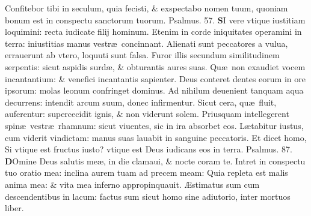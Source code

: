 \documentclass[a5paper,10pt]{book}
\def\ae{æ}
\def\AE{Æ}
\begin{document}
\begin{multicols*}{2}
\newline \color{red} C\color{black}onfitebor tibi in seculum, quia fecisti, \& exspectabo nomen tuum, quoniam bonum est in conspectu sanctorum tuorum. \quad \color{red} Psalmus. \hypertarget{ps57}{57.} \color{black}
\vspace{-.25em}
\lettrine[lines=2]{\bfseries \color{red} S}{}I vere vtique iustitiam loquimini: recta iudicate filij hominum.
\newline \color{red} E\color{black}tenim in corde iniquitates operamini in terra: iniustitias manus vestr\ae \ concinnant.
\newline \color{red} A\color{black}lienati sunt peccatores a vulua, errauerunt ab vtero, loquuti sunt falsa.
\newline \color{red} F\color{black}uror illis secundum similitudinem serpentis: sicut aspidis surd\ae , \& obturantis aures suas.
\newline \color{red} Q\color{black}u\ae \ non exaudiet vocem incantantium: \& venefici incantantis sapienter.
\newline \color{red} D\color{black}eus conteret dentes eorum in ore ipsorum: molas leonum confringet dominus.
\newline \color{red} A\color{black}d nihilum deuenient tanquam aqua decurrens: intendit arcum suum, donec infirmentur.
\newline \color{red} S\color{black}icut cera, qu\ae \ fluit, auferentur: supercecidit ignis, \& non viderunt solem.
\newline \color{red} P\color{black}riusquam intellegerent spin\ae \ vestr\ae \ rhamnum: sicut viuentes, sic in ira absorbet eos.
\newline \color{red} L\color{black}\ae tabitur iustus, cum viderit vindictam: manus suas lauabit in sanguine peccatoris.
\newline \color{red} E\color{black}t dicet homo, Si vtique est fructus iusto? vtique est Deus iudicans eos in terra. \quad \color{red} Psalmus. \hypertarget{ps87}{87.} \color{black}
\vspace{-.25em}
\lettrine[lines=2]{\bfseries \color{red} D}{}Omine Deus salutis me\ae , in die clamaui, \& nocte coram te.
\newline \color{red} I\color{black}ntret in conspectu tuo oratio mea: inclina aurem tuam ad precem meam:
\newline \color{red} Q\color{black}uia repleta est malis anima mea: \& vita mea inferno appropinquauit.
\newline \color{red} \AE\color{black}stimatus sum cum descendentibus in lacum: factus sum sicut homo sine adiutorio, inter mortuos liber.

\end{multicols*}
\end{document}
